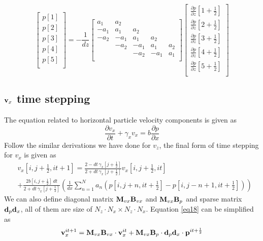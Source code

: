 \documentclass[revised,endfloat]{geophysics}
\begin{document}
$$
\begin{bmatrix}
p[1] \\
p[2] \\
p[3] \\
p[4] \\
p[5] \\
\end{bmatrix}
= - \frac{1}{dz} \begin{bmatrix}
a_1 & a_2 & & & \\
-a_1 & a_1 & a_2 &  & \\
-a_2 & -a_1 & a_1 & a_2 &  \\
& -a_2& -a_1 & a_1 & a_2 \\
& & -a_2 & -a_1 & a_1 \\
\end{bmatrix}
\begin{bmatrix}
\frac{\partial p}{\partial z}[1+\frac{1}{2}] \\
\frac{\partial p}{\partial z}[2+\frac{1}{2}] \\
\frac{\partial p}{\partial z}[3+\frac{1}{2}] \\
\frac{\partial p}{\partial z}[4+\frac{1}{2}] \\
\frac{\partial p}{\partial z}[5+\frac{1}{2}] \\
\end{bmatrix}
\label{eq17}
$$

\subsection{${\bf v}_x$ time stepping}
The equation related to horizontal particle velocity components is given as 
\begin{equation}
\frac{\partial v_x}{\partial t} + \gamma_x v_x = b \frac{\partial p}{\partial x}
\end{equation}
Follow the similar derivations we have done for $v_z$, the final form of time stepping for $v_x$ is given as 
\begin{equation}
\begin{split}
& v_x[i,j+\frac{1}{2},it+1] =  \frac{2- dt\, \gamma_x[j+\frac{1}{2}]}{2+ dt\, \gamma_x[j+\frac{1}{2}]}v_x[i,j+\frac{1}{2},it] \\
& + \frac{2b[i,j+\frac{1}{2}] \, dt}{2+ dt\, \gamma_x[j+\frac{1}{2}]}
\left( \frac{1}{dx} \sum_{n=1}^N  a_n \left( p[i,j+n,it+\frac{1}{2}] - p[i,j-n+1,it+\frac{1}{2}]\right) \right)
\end{split}
\label{eq18}
\end{equation}
We can also define diagonal matrix ${\bf M}_{vx}{\bf B}_{vx}$ and ${\bf M}_{vx}{\bf B}_{p}$ and sparse matrix ${\bf d}_p{\bf d}_x$, all of them are size of $N_z \cdot N_x \times N_z \cdot N_x$. Equation \ref{eq18} can be simplified as 
\begin{equation}
{\bf v}_x^{it+1} = {\bf M}_{vx}{\bf B}_{vx}  \cdot {\bf v}_x^{it} +  {\bf M}_{vx}{\bf B}_{p} \cdot {\bf d}_p{\bf d}_x \cdot {\bf p}^{it+\frac{1}{2}}
\label{eq19}
\end{equation}
\end{document}
